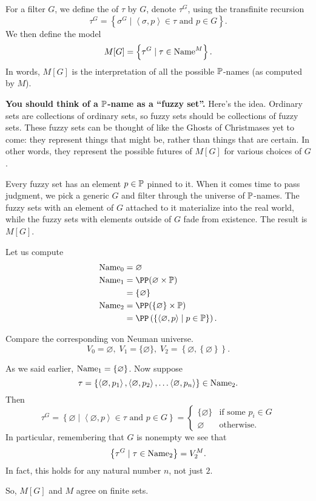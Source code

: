 \begin{definition}
	For a filter $G$, we define the  of $\tau$ by $G$,
	denote $\tau^G$, using the transfinite recursion
	\[ \tau^G
		= \left\{ \sigma^G
		\mid \left<\sigma, p\right> \in \tau
		\text{ and } p \in G\right\}. \]
	We then define the model
	\[ M[G] = \left\{ \tau^G \mid \tau \in \text{Name}^M \right\}. \]
	In words, $M[G]$ is the interpretation of all the possible $\mathbb P$-names
	(as computed by $M$).
\end{definition}

\textbf{You should think of a $\mathbb P$-name as a ``fuzzy set''.}
Here's the idea.
Ordinary sets are collections of ordinary sets,
so fuzzy sets should be collections of fuzzy sets.
These fuzzy sets can be thought of like the Ghosts of Christmases yet to come:
they represent things that might be, rather than things that are certain.
In other words, they represent the possible futures of $M[G]$ for various choices of $G$.

Every fuzzy set has an element $p \in \mathbb P$ pinned to it.
When it comes time to pass judgment,
we pick a generic $G$ and filter through the universe of $\mathbb P$-names.
The fuzzy sets with an element of $G$ attached to it materialize into the real world,
while the fuzzy sets with elements outside of $G$ fade from existence.
The result is $M[G]$.

\begin{example}
	Let us compute
	\begin{align*}
		\Name_0 &= \varnothing \\
		\Name_1 &= \PP(\varnothing \times \Po) \\
		&= \{\varnothing\} \\
		\Name_2 &= \PP(\{\varnothing\} \times \Po) \\
		&= \PP\left( \left\{ 
			\left<\varnothing, p\right>
			\mid p \in \Po
		\right\} \right).
	\end{align*}
\end{example}
Compare the corresponding von Neuman universe.
\[ V_0 = \varnothing, \; V_1 = \{\varnothing\}, \;
V_2 = \left\{ \varnothing, \left\{ \varnothing \right\} \right\}. \]

\begin{example}
	As we said earlier, $\text{Name}_1 = \{\varnothing\}$.
	Now suppose
	\[ \tau =
		\left\{
			\left<\varnothing, p_1\right>,
			\left<\varnothing, p_2\right>,
			\dots
			\left<\varnothing, p_n\right>
		\right\} 
		\in \text{Name}_2. \]
	Then 
	\[
		\tau^G
		= \left\{ \varnothing \mid
		\left<\varnothing, p\right> \in \tau \text{ and } p \in G\right\}
		=
		\begin{cases}
			\{\varnothing\} & \text{if some } p_i \in G \\
			\varnothing & \text{otherwise}.
		\end{cases}
	\]
	In particular, remembering that $G$ is nonempty we see that
	\[ \left\{ \tau^G \mid \tau \in \text{Name}_2 \right\} = V_2^M. \]
	In fact, this holds for any natural number $n$, not just $2$.
\end{example}
So, $M[G]$ and $M$ agree on finite sets.

